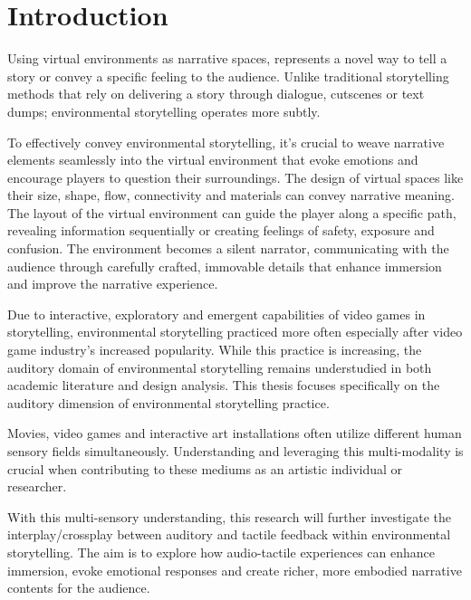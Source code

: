 \chapter{Introduction}
    Using virtual environments as narrative spaces, represents a novel way to tell a story or convey a specific feeling to the audience. Unlike traditional storytelling methods that rely on delivering a story through dialogue, cutscenes or text dumps; environmental storytelling operates more subtly.\par

    To effectively convey environmental storytelling, it’s crucial to weave narrative elements seamlessly into the virtual environment that evoke emotions and encourage players to question their surroundings. The design of virtual spaces like their size, shape, flow, connectivity and materials can convey narrative meaning. The layout of the virtual environment can guide the player along a specific path, revealing information sequentially or creating feelings of safety, exposure and confusion. The environment becomes a silent narrator, communicating with the audience through carefully crafted, immovable details that enhance immersion and improve the narrative experience\cite{Environmental_Storytelling_Blogpost}.\par

    Due to interactive, exploratory and emergent capabilities of video games in storytelling, environmental storytelling practiced more often especially after video game industry's increased popularity\cite{Video_Game_Industry_Stat}. While this practice is increasing, the auditory domain of environmental storytelling remains understudied in both academic literature and design analysis\cite{Archaeological_Gameworld}. This thesis focuses specifically on the auditory dimension of environmental storytelling practice.\par

    Movies, video games and interactive art installations often utilize different human sensory fields simultaneously. Understanding and leveraging this multi-modality is crucial when contributing to these mediums as an artistic individual or researcher.\par

    With this multi-sensory understanding, this research will further investigate the interplay/crossplay between auditory and tactile feedback within environmental storytelling. The aim is to explore how audio-tactile experiences can enhance immersion, evoke emotional responses and create richer, more embodied narrative contents for the audience.\par
